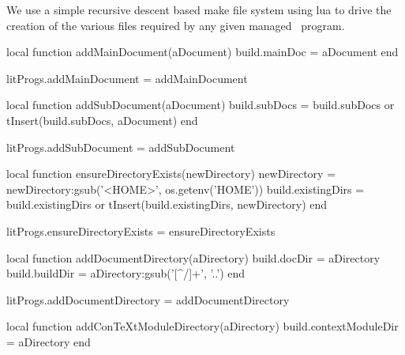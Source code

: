 
\startchapter[title=Lua Make System Files]

We use a simple recursive descent based make file system using lua to 
drive the creation of the various files required by any given 
 managed \ConTeXt\ program. 

\startMkIVCode
\def\addMainDocument#1{
  \directlua{
    thirddata.literateProgs.addMainDocument('#1')
  }
}

\def\addSubDocument#1{
  \directlua{
    thirddata.literateProgs.addSubDocument('#1')
  }
}

\def\ensureDirectoryExists#1{
  \directlua{
    thirddata.literateProgs.ensureDirectoryExists('#1')
  }
}

\def\addDocumentDirectory#1{
  \directlua{
    thirddata.literateProgs.addDocumentDirectory('#1')
  }
}

\def\addConTeXtModuleDirectory#1{
  \directlua{
    thirddata.literateProgs.addConTeXtModuleDirectory('#1')
  }
}

\def\addCCodeLibDirectory#1{%
  \directlua{
    thirddata.literateProgs.addCCodeLibDirectory('#1')
  }
}

\def\addCCodeLib#1{%
  \directlua{
    thirddata.literateProgs.addCCodeLib('#1')
  }
}
\stopMkIVCode

\startLuaCode
local function addMainDocument(aDocument)
  build.mainDoc = aDocument
end

litProgs.addMainDocument = addMainDocument

local function addSubDocument(aDocument)
  build.subDocs = build.subDocs or { }
  tInsert(build.subDocs, aDocument)
end

litProgs.addSubDocument = addSubDocument

local function ensureDirectoryExists(newDirectory)
  newDirectory =
    newDirectory:gsub('<HOME>', os.getenv('HOME'))
  build.existingDirs = build.existingDirs or { }
  tInsert(build.existingDirs, newDirectory)
end

litProgs.ensureDirectoryExists = ensureDirectoryExists

local function addDocumentDirectory(aDirectory)
  build.docDir   = aDirectory
  build.buildDir = aDirectory:gsub('[^/]+', '..')
end

litProgs.addDocumentDirectory = addDocumentDirectory

local function addConTeXtModuleDirectory(aDirectory)
  build.contextModuleDir = aDirectory
end

